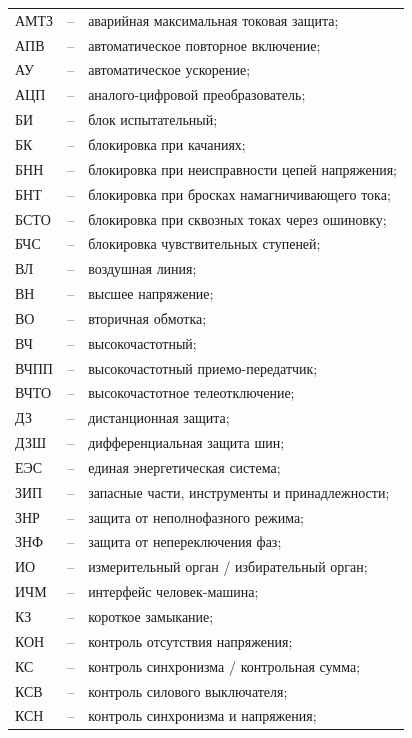 \documentclass[a4paper, 12pt, table, hidelinks, DIV=calc]{extarticle}
\begin{document}
\begin{longtable}{>{\raggedright\arraybackslash}m{2cm}>{\raggedright\arraybackslash}m{0.5cm}>{\raggedright\arraybackslash}m{20cm}}
\endfirsthead\endhead\endfoot\endlastfoot
АМТЗ & -- & аварийная максимальная токовая защита; \\
АПВ & -- & автоматическое повторное включение; \\
АУ & -- & автоматическое ускорение; \\
АЦП & -- & аналого-цифровой преобразователь; \\
БИ & -- & блок испытательный; \\
БК & -- & блокировка при качаниях; \\
БНН & -- & блокировка при неисправности цепей напряжения; \\
БНТ & -- & блокировка при бросках намагничивающего тока; \\
БСТО & -- & блокировка при сквозных токах через ошиновку; \\
БЧС & -- & блокировка чувствительных ступеней; \\
ВЛ & -- & воздушная линия; \\
ВН & -- & высшее напряжение; \\
ВО & -- & вторичная обмотка; \\
ВЧ & -- & высокочастотный; \\
ВЧПП & -- & высокочастотный приемо-передатчик; \\
ВЧТО & -- & высокочастотное телеотключение; \\
ДЗ & -- & дистанционная защита; \\
ДЗШ & -- & дифференциальная защита шин; \\
ЕЭС & -- & единая энергетическая система; \\
ЗИП & -- & запасные части, инструменты и принадлежности; \\
ЗНР & -- & защита от неполнофазного режима; \\
ЗНФ & -- & защита от непереключения фаз; \\
ИО & -- & измерительный орган / избирательный орган; \\
ИЧМ & -- & интерфейс человек-машина; \\
КЗ & -- & короткое замыкание; \\
КОН & -- & контроль отсутствия напряжения; \\
КС & -- & контроль синхронизма / контрольная сумма; \\
КСВ & -- & контроль силового выключателя; \\
КСН & -- & контроль синхронизма и напряжения; \\

\end{longtable}
\end{document}
